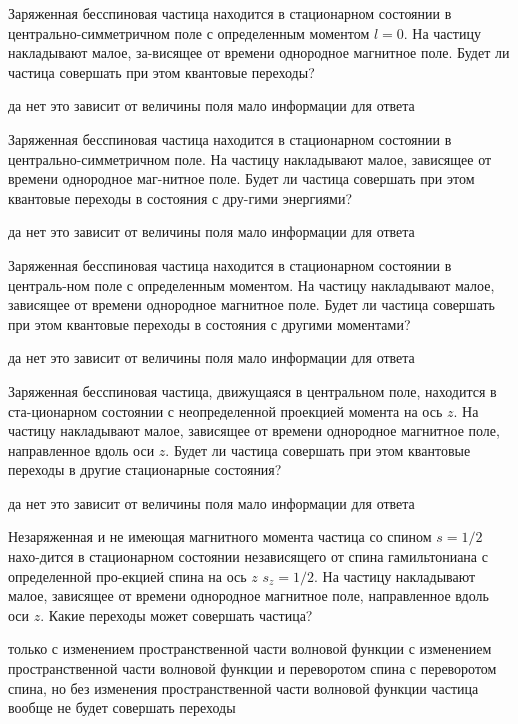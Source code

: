 \documentclass[11pt,a4paper]{exam}
\begin{document}
\begin{questions}
\question Заряженная бесспиновая частица находится в стационарном состоянии в центрально-симметричном поле с определенным моментом $l = 0$. На частицу накладывают малое, за-висящее от времени однородное магнитное поле. Будет ли частица совершать при этом квантовые переходы?
\begin{choices}
\choice да
\choice нет
\choice это зависит от величины поля
\choice мало информации для ответа
\end{choices}

\question Заряженная бесспиновая частица находится в стационарном состоянии в центрально-симметричном поле. На частицу накладывают малое, зависящее от времени однородное маг-нитное поле. Будет ли частица совершать при этом квантовые переходы в состояния с дру-гими энергиями?
\begin{choices}
\choice да
\choice нет
\choice это зависит от величины поля
\choice мало информации для ответа
\end{choices}

\question Заряженная бесспиновая частица находится в стационарном состоянии в централь-ном поле с определенным моментом. На частицу накладывают малое, зависящее от времени однородное магнитное поле. Будет ли частица совершать при этом квантовые переходы в состояния с другими моментами?
\begin{choices}
\choice да
\choice нет
\choice это зависит от величины поля
\choice мало информации для ответа
\end{choices}

\question Заряженная бесспиновая частица, движущаяся в центральном поле, находится в ста-ционарном состоянии с неопределенной проекцией момента на ось $z$. На частицу накладывают малое, зависящее от времени однородное магнитное поле, направленное вдоль оси $z$. Будет ли частица совершать при этом квантовые переходы в другие стационарные состояния?
\begin{choices}
\choice да
\choice нет
\choice это зависит от величины поля
\choice мало информации для ответа
\end{choices}

\question Незаряженная и не имеющая магнитного момента частица со спином $s = 1/2$ нахо-дится в стационарном состоянии независящего от спина гамильтониана с определенной про-екцией спина на ось $z$ ${s_z} = 1/2$. На частицу накладывают малое, зависящее от времени однородное магнитное поле, направленное вдоль оси $z$. Какие переходы может совершать частица?
\begin{choices}
\choice только с изменением пространственной части волновой функции
\choice с изменением пространственной части волновой функции и переворотом спина
\choice с переворотом спина, но без изменения пространственной части волновой функции
\choice частица вообще не будет совершать переходы
\end{choices}


\end{questions}
\end{document}

